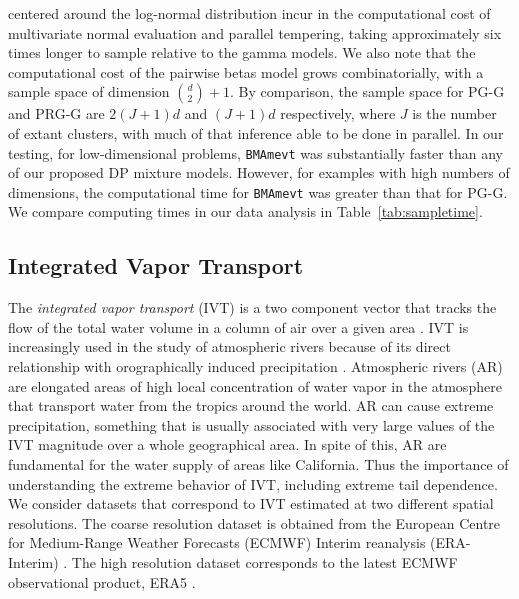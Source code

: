     centered around the log-normal distribution incur in the computational cost of 
    multivariate normal evaluation and parallel tempering, taking approximately six times
    longer to sample relative to the gamma models.  We also note that the 
    computational cost of the pairwise betas model grows combinatorially, with a 
    sample space of dimension $\binom{d}{2} + 1$.  By comparison, the sample space for 
    PG-G and PRG-G are $2(J+1)d$ and $(J+1)d$ respectively, where $J$ is the number of extant
    clusters, with much of that inference able to be done in parallel.  
    In our testing, for low-dimensional problems, \verb|BMAmevt| was 
    substantially faster than any of our proposed DP mixture models.  However, for examples with 
    high numbers of dimensions, the computational time for 
    \verb|BMAmevt| was greater than that for PG-G.  We compare computing
    times in our data analysis in Table~\ref{tab:sampletime}.

\subsection{Integrated Vapor Transport\label{subsec:ivt}}
The \emph{integrated vapor transport} (IVT) is a two component vector 
    that tracks the flow of the total water volume in a column of air 
    over a given area \citep{ralph2017}.  IVT is increasingly used in 
    the study of atmospheric rivers because of its direct relationship 
    with orographically induced precipitation \citep{neiman2009water}. 
    Atmospheric rivers (AR) are elongated areas of high 
    local concentration of water vapor in the atmosphere that transport water
    from the tropics around the world. AR can cause extreme 
    precipitation,  something that is usually associated with very large values
    of the IVT magnitude over a whole geographical area. In spite of this, AR
    are fundamental for the water supply of areas like California. Thus the
    importance of understanding the extreme behavior of IVT, including 
    extreme tail dependence. We consider datasets that correspond to IVT
    estimated at two different spatial resolutions. The coarse resolution dataset
    is obtained from the European Centre for Medium-Range Weather Forecasts
    (ECMWF) Interim reanalysis (ERA-Interim) \citep{berrisford2011atmospheric,dee2011era}. 
    The high resolution dataset corresponds to the latest ECMWF 
    observational product, ERA5 \citep{hersbach2020era5}. 

